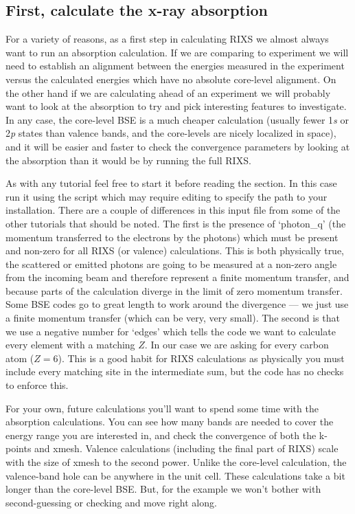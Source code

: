 \documentclass[11pt]{report}
\begin{document}
\subsection{First, calculate the x-ray absorption}
For a variety of reasons, as a first step in calculating RIXS we almost always want to run an absorption calculation.
If we are comparing to experiment we will need to establish an alignment between the energies measured in the experiment versus the calculated energies which have no absolute core-level alignment. 
On the other hand if we are calculating ahead of an experiment we will probably want to look at the absorption to try and pick interesting features to investigate. 
In any case, the core-level BSE is a much cheaper calculation (usually fewer 1{\it s} or 2{\it p} states than valence bands, and the core-levels are nicely localized in space), and it will be easier and faster to check the convergence parameters by looking at the absorption than it would be by running the full RIXS.

As with any tutorial feel free to start it before reading the section. In this case run it using the script  which may require editing to specify the path to your  installation. 
There are a couple of differences in this input file  from some of the other tutorials that should be noted. 
The first is the presence of `photon\_q' (the momentum transferred to the electrons by the photons) which must be present and non-zero for all RIXS (or valence) calculations. 
This is both physically true, the scattered or emitted photons are going to be measured at a non-zero angle from the incoming beam and therefore represent a finite momentum transfer, and because parts of the calculation diverge in the limit of zero momentum transfer. 
Some BSE codes go to great length to work around the divergence --- we just use a finite momentum transfer (which can be very, very small).
The second is that we use a negative number for `edges' which tells the code we want to calculate every element with a matching $Z$. In our case we are asking for every carbon atom ($Z=6$). 
This is a good habit for RIXS calculations as physically you must include every matching site in the intermediate sum, but the code has no checks to enforce this.

For your own, future calculations you'll want to spend some time with the absorption calculations. 
You can see how many bands are needed to cover the energy range you are interested in, and check the convergence of both the k-points and xmesh. 
Valence calculations (including the final part of RIXS) scale with the size of xmesh to the second power. Unlike the core-level calculation, the valence-band hole can be anywhere in the unit cell.
These calculations take a bit longer than the core-level BSE.
But, for the example we won't bother with second-guessing or checking and move right along.
\end{document}
